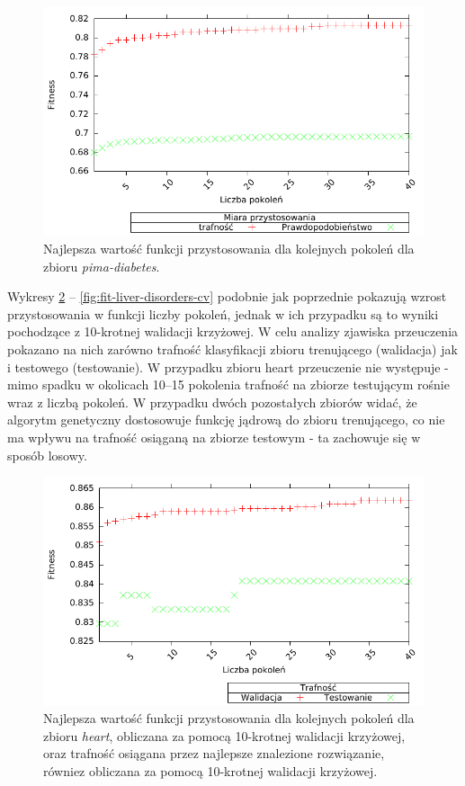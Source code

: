         \begin{figure}
                \includegraphics[scale=0.90]{figures/results/fitness/fitness-pima-diabetes}
                \caption{Najlepsza wartość funkcji przystosowania dla kolejnych pokoleń dla zbioru \emph{pima-diabetes}.\label{fig:fit-pima-diabetes}}
        \end{figure}    

Wykresy \ref{fig:fit-heart-cv} -- \ref{fig:fit-liver-disorders-cv} podobnie jak poprzednie pokazują wzrost przystosowania w funkcji liczby pokoleń, jednak w ich przypadku są to wyniki pochodzące z 10-krotnej walidacji krzyżowej. W celu analizy zjawiska przeuczenia pokazano na nich zarówno trafność klasyfikacji zbioru trenującego (walidacja) jak i testowego (testowanie). W przypadku zbioru heart przeuczenie nie występuje - mimo spadku w okolicach 10--15 pokolenia trafność na zbiorze testującym rośnie wraz z liczbą pokoleń. W przypadku dwóch pozostałych zbiorów widać, że algorytm genetyczny dostosowuje funkcję jądrową do zbioru trenującego, co nie ma wpływu na trafność osiąganą na zbiorze testowym - ta zachowuje się w sposób losowy.

	\begin{figure}
		\includegraphics[scale=0.90]{figures/results/fitness/fitness-heart-CV}
		\caption{Najlepsza wartość funkcji przystosowania dla kolejnych pokoleń dla zbioru \emph{heart}, obliczana za pomocą 10-krotnej walidacji krzyżowej, oraz trafność osiągana przez najlepsze znalezione rozwiązanie, równiez obliczana za pomocą 10-krotnej walidacji krzyżowej. \label{fig:fit-heart-cv}}
	\end{figure}
	
